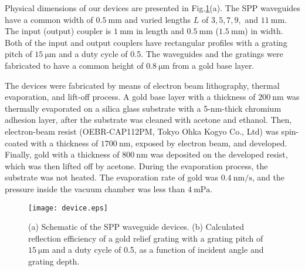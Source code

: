 \documentclass[aip,apl,reprint]{revtex4-1}
\begin{document}
Physical dimensions of our devices are presented in Fig.\ref{fig:device}(a).  The SPP waveguides have a common width of $0.5\:\mathrm{mm}$ and varied lengths $L$ of $3, 5, 7, 9,$ and $11\:\mathrm{mm}$. The input (output) coupler is $1\:\mathrm{mm}$ in length and $0.5\:\mathrm{mm}$ ($1.5\:\mathrm{mm}$) in width. Both of the input and output couplers have rectangular profiles with a grating pitch of $15\:\mathrm{\mu m}$ and a duty cycle of 0.5. The waveguides and the gratings were fabricated to have a common height of $0.8\:\mathrm{\mu m}$ from a gold base layer.

The devices were fabricated by means of electron beam lithography, thermal evaporation, and lift-off process. A gold base layer with a thickness of $200\:\mathrm{nm}$ was thermally evaporated on a silica glass substrate with a 5-nm-thick chromium adhesion layer, after the substrate was cleaned with acetone and ethanol. Then, electron-beam resist (OEBR-CAP112PM, Tokyo Ohka Kogyo Co., Ltd) was spin-coated with a thickness of $1700\:\mathrm{nm}$, exposed by electron beam, and developed. Finally, gold with a thickness of $800\:\mathrm{nm}$ was deposited on the developed resist, which was then lifted off by acetone. During the evaporation process, the substrate was not heated. The evaporation rate of gold was $0.4\:\mathrm{nm/s}$, and the pressure inside the vacuum chamber was less than $4\:\mathrm{mPa}$.

 \begin{figure}
    \texttt{[image: device.eps]}
    \caption{(a) Schematic of the SPP waveguide devices. (b) Calculated reflection efficiency of a gold relief grating with a grating pitch of $15\:\mathrm{\mu m}$ and a duty cycle of 0.5, as a function of incident angle and grating depth.}
     \label{fig:device}
\end{figure}
\end{document}
